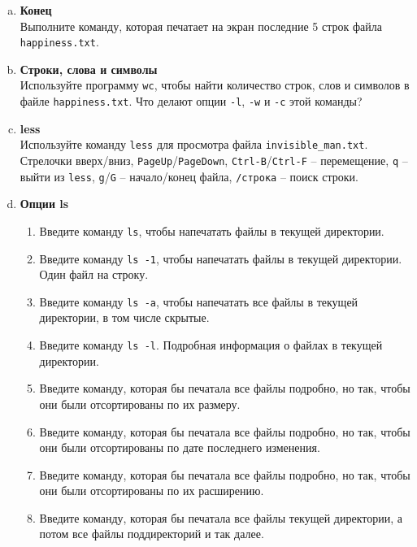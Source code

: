 \documentclass{article}
\begin{document}
\begin{enumerate}[a.]
\item \textbf{Конец}\\
Выполните команду, которая печатает на экран последние 5 строк файла \texttt{happiness.txt}.

\item \textbf{Строки, слова и символы}\\
Используйте программу \texttt{wc}, чтобы найти количество строк, слов и символов в файле \texttt{happiness.txt}.
Что делают опции \texttt{-l}, \texttt{-w} и \texttt{-c} этой команды?

\item \textbf{less}\\
Используйте команду \texttt{less} для просмотра файла \texttt{invisible\_man.txt}.\\
Стрелочки вверх/вниз, \texttt{PageUp}/\texttt{PageDown}, \texttt{Ctrl-B}/\texttt{Ctrl-F} -- перемещение, \texttt{q} -- выйти из \texttt{less}, \texttt{g}/\texttt{G} -- начало/конец файла, \texttt{/строка} -- поиск строки. 
\item \textbf{Опции ls}
\begin{enumerate}
\item Введите команду \texttt{ls}, чтобы напечатать файлы в текущей директории.
\item Введите команду \texttt{ls -1}, чтобы напечатать файлы в текущей директории. Один файл на строку.
\item Введите команду \texttt{ls -a}, чтобы напечатать все файлы в текущей директории, в том числе скрытые.
\item Введите команду \texttt{ls -l}. Подробная информация о файлах в текущей директории.
\item Введите команду, которая бы печатала все файлы подробно, но так, чтобы они были отсортированы по их размеру.
\item Введите команду, которая бы печатала все файлы подробно, но так, чтобы они были отсортированы по дате последнего изменения.
\item Введите команду, которая бы печатала все файлы подробно, но так, чтобы они были отсортированы по их расширению.
\item Введите команду, которая бы печатала все файлы текущей директории, а потом все файлы поддиректорий и так далее.
\end{enumerate}
\end{enumerate}
\end{document}
